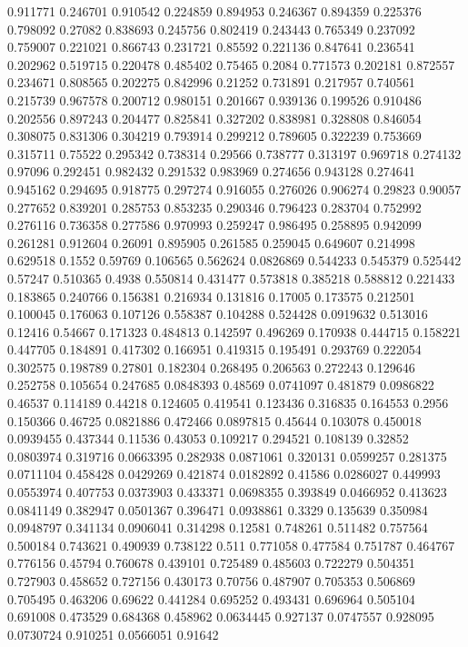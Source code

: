 0.911771 0.246701
0.910542 0.224859
0.894953 0.246367
0.894359 0.225376
0.798092 0.27082
0.838693 0.245756
0.802419 0.243443
0.765349 0.237092
0.759007 0.221021
0.866743 0.231721
0.85592 0.221136
0.847641 0.236541
0.202962 0.519715
0.220478 0.485402
0.75465 0.2084
0.771573 0.202181
0.872557 0.234671
0.808565 0.202275
0.842996 0.21252
0.731891 0.217957
0.740561 0.215739
0.967578 0.200712
0.980151 0.201667
0.939136 0.199526
0.910486 0.202556
0.897243 0.204477
0.825841 0.327202
0.838981 0.328808
0.846054 0.308075
0.831306 0.304219
0.793914 0.299212
0.789605 0.322239
0.753669 0.315711
0.75522 0.295342
0.738314 0.29566
0.738777 0.313197
0.969718 0.274132
0.97096 0.292451
0.982432 0.291532
0.983969 0.274656
0.943128 0.274641
0.945162 0.294695
0.918775 0.297274
0.916055 0.276026
0.906274 0.29823
0.90057 0.277652
0.839201 0.285753
0.853235 0.290346
0.796423 0.283704
0.752992 0.276116
0.736358 0.277586
0.970993 0.259247
0.986495 0.258895
0.942099 0.261281
0.912604 0.26091
0.895905 0.261585
0.259045 0.649607
0.214998 0.629518
0.1552 0.59769
0.106565 0.562624
0.0826869 0.544233
0.545379 0.525442
0.57247 0.510365
0.4938 0.550814
0.431477 0.573818
0.385218 0.588812
0.221433 0.183865
0.240766 0.156381
0.216934 0.131816
0.17005 0.173575
0.212501 0.100045
0.176063 0.107126
0.558387 0.104288
0.524428 0.0919632
0.513016 0.12416
0.54667 0.171323
0.484813 0.142597
0.496269 0.170938
0.444715 0.158221
0.447705 0.184891
0.417302 0.166951
0.419315 0.195491
0.293769 0.222054
0.302575 0.198789
0.27801 0.182304
0.268495 0.206563
0.272243 0.129646
0.252758 0.105654
0.247685 0.0848393
0.48569 0.0741097
0.481879 0.0986822
0.46537 0.114189
0.44218 0.124605
0.419541 0.123436
0.316835 0.164553
0.2956 0.150366
0.46725 0.0821886
0.472466 0.0897815
0.45644 0.103078
0.450018 0.0939455
0.437344 0.11536
0.43053 0.109217
0.294521 0.108139
0.32852 0.0803974
0.319716 0.0663395
0.282938 0.0871061
0.320131 0.0599257
0.281375 0.0711104
0.458428 0.0429269
0.421874 0.0182892
0.41586 0.0286027
0.449993 0.0553974
0.407753 0.0373903
0.433371 0.0698355
0.393849 0.0466952
0.413623 0.0841149
0.382947 0.0501367
0.396471 0.0938861
0.3329 0.135639
0.350984 0.0948797
0.341134 0.0906041
0.314298 0.12581
0.748261 0.511482
0.757564 0.500184
0.743621 0.490939
0.738122 0.511
0.771058 0.477584
0.751787 0.464767
0.776156 0.45794
0.760678 0.439101
0.725489 0.485603
0.722279 0.504351
0.727903 0.458652
0.727156 0.430173
0.70756 0.487907
0.705353 0.506869
0.705495 0.463206
0.69622 0.441284
0.695252 0.493431
0.696964 0.505104
0.691008 0.473529
0.684368 0.458962
0.0634445 0.927137
0.0747557 0.928095
0.0730724 0.910251
0.0566051 0.91642
